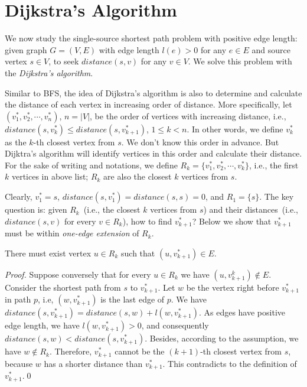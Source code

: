 \section{Dijkstra's Algorithm}

We now study the single-source shortest path problem with positive edge length:
given graph $G = (V, E)$ with edge length $l(e) > 0$ for any $e\in E$ and
source vertex $s\in V$, to seek $distance(s, v)$ for any $v\in V$.
We solve this problem with the \emph{Dijkstra's algorithm}.

Similar to BFS, the idea of Dijkstra's algorithm is also to
determine and calculate the distance of each vertex
in increasing order of distance.
More specifically, let $(v_1^*, v_2^*, \cdots, v_n^*)$, $n = |V|$,
be the order of vertices with increasing distance, i.e., $distance(s, v_k^*) \le distance(s, v_{k+1}^*)$, $1\le k < n$.
In other words, we define $v_k^*$ as the $k$-th closest vertex from $s$.
We don't know this order in advance.
But Dijktra's algorithm will identify vertices in this order and calculate
their distance.
For the sake of writing and notations, we define $R_k = \{v_1^*, v_2^*, \cdots, v_k^*\}$, i.e., 
the first $k$ vertices in above list; $R_k$ are also the closest $k$ vertices from $s$.

Clearly, $v_1^* = s$, $distance(s, v_1^*) = distance(s, s) = 0$, and $R_1 = \{s\}$.
The key question is: given $R_k$~(i.e., the closest $k$ vertices from $s$) and their distances~(i.e., $distance(s, v)$ for every $v\in R_k$),
how to find $v_{k + 1}^*$?
Below we show that $v_{k + 1}^*$ must be within \emph{one-edge extension} of $R_k$.
\begin{claim}
There must exist vertex $u\in R_k$ such that $(u, v_{k+1}^*) \in E$.
\end{claim}
\emph{Proof.} Suppose conversely that for every $u\in R_k$ we have $(u, v_{k+1}^k)\not\in E$.
Consider the shortest path from $s$ to $v_{k+1}^*$.
Let $w$ be the vertex right before $v_{k+1}^*$ in path $p$, i.e, $(w, v_{k+1}^*)$ is the last edge of $p$.
We have $distance(s, v_{k+1}^*) = distance(s, w) + l(w, v_{k+1}^*)$. %
As edges have positive edge length, we have $l(w, v_{k+1}^*) > 0$, and consequently
$distance(s, w) < distance(s, v_{k+1}^*)$.
Besides, according to the assumption, we have $w\not\in R_k$.
Therefore, $v_{k+1}^*$ cannot be the $(k+1)$-th closest vertex from $s$,
because $w$ has a shorter distance than $v_{k+1}^*$. This contradicts to the definition of $v_{k+1}^*$.\qed

